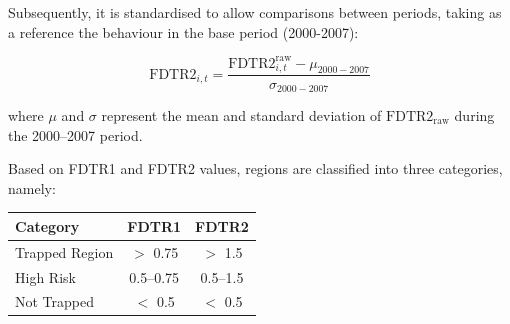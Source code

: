 \documentclass[a4paper,11pt,oneside]{article}
\begin{document}
Subsequently, it is standardised to allow comparisons between periods, taking 
as a reference the behaviour in the base period (2000-2007):

\begin{equation}
\label{eq:sexta}
\text{FDTR2}_{i,t} = \frac{\text{FDTR2}_{i,t}^{\text{raw}} - \mu_{2000-2007}}
{\sigma_{2000-2007}}
\end{equation}

\noindent where $\mu$ and $\sigma$ represent the mean and standard deviation 
of $\text{FDTR2}_{\text{raw}}$ during the 2000--2007 period.






Based on FDTR1 and FDTR2 values, regions are classified into three categories, namely:


\begin{center}
\begin{tabular}{|l|c|c|}
\hline
\textbf{Category} & \textbf{FDTR1} & \textbf{FDTR2} \\
\hline
Trapped Region & $>$ 0.75 & $>$ 1.5 \\
High Risk & 0.5--0.75 & 0.5--1.5 \\
Not Trapped & $<$ 0.5 & $<$ 0.5 \\
\hline
\end{tabular}
\end{center}
\end{document}
